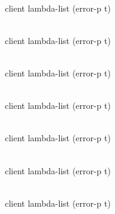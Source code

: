 \\
{client lambda-list \key (error-p t)}

\\
{client lambda-list \key (error-p t)}

\\
{client lambda-list \key (error-p t)}

\\
{client lambda-list \key (error-p t)}

\\
{client lambda-list \key (error-p t)}

\\
{client lambda-list \key (error-p t)}

\\
{client lambda-list \key (error-p t)}
